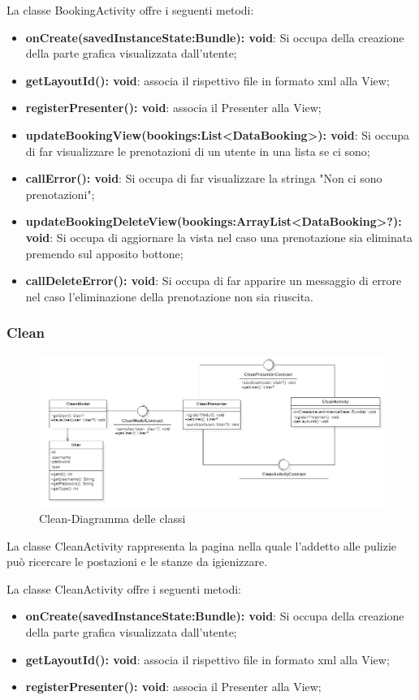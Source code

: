La classe BookingActivity offre i seguenti metodi:
\begin{itemize}
	\item \textbf{onCreate(savedInstanceState:Bundle): void}: Si occupa della creazione della parte grafica visualizzata dall'utente; 
	\item \textbf{getLayoutId(): void}: associa il rispettivo file in formato xml alla View;
	\item \textbf{registerPresenter(): void}: associa il Presenter alla View;
	\item \textbf{updateBookingView(bookings:List<DataBooking>): void}: Si occupa di far visualizzare le prenotazioni di un utente in una lista se ci sono;
	\item \textbf{callError(): void}: Si occupa di far visualizzare la stringa "Non ci sono prenotazioni";
	\item \textbf{updateBookingDeleteView(bookings:ArrayList<DataBooking>?): void}: Si occupa di aggiornare la vista nel caso una prenotazione sia eliminata premendo sul apposito bottone;
	\item \textbf{callDeleteError(): void}: Si occupa di far apparire un messaggio di errore nel caso l'eliminazione della prenotazione non sia riuscita.
\end{itemize}

\subsubsection{Clean}
\begin{figure}[H]
	\centering
	\includegraphics[width=16cm]{res/images/Clean.png}
	\caption{Clean-Diagramma delle classi}
	\label{fig:Clean-Diagramma delle classi}
\end{figure}
La classe CleanActivity rappresenta la pagina nella quale l'addetto alle pulizie può ricercare le postazioni e le stanze da igienizzare.

La classe CleanActivity offre i seguenti metodi:
\begin{itemize}
	\item \textbf{onCreate(savedInstanceState:Bundle): void}: Si occupa della creazione della parte grafica visualizzata dall'utente; 
	\item \textbf{getLayoutId(): void}: associa il rispettivo file in formato xml alla View;
	\item \textbf{registerPresenter(): void}: associa il Presenter alla View; 
\end{itemize}

